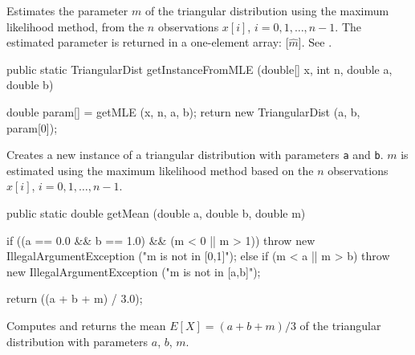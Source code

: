 \begin{tabb}
   Estimates the parameter $m$ of the triangular distribution using the
   maximum likelihood method, from the $n$ observations $x[i]$,
   $i = 0, 1,\ldots, n-1$. The estimated parameter is returned in a one-element
   array: [$\hat m$].  See \cite{tOLI72a,tHUA07a,tKOT04a}.
\end{tabb}
\begin{htmlonly}
\end{htmlonly}
\begin{code}

   public static TriangularDist getInstanceFromMLE (double[] x, int n,
                                                    double a, double b)\begin{hide} {
      double param[] = getMLE (x, n, a, b);
      return new TriangularDist (a, b, param[0]);
   }\end{hide}
\end{code}
\begin{tabb}
  Creates a new instance of a triangular distribution with parameters
  \texttt{a} and \texttt{b}.  $m$ is estimated using the maximum
  likelihood method based on the $n$ observations
  $x[i]$, $i = 0, 1, \ldots, n-1$.
\end{tabb}
\begin{htmlonly}
\end{htmlonly}
\begin{code}

   public static double getMean (double a, double b, double m)\begin{hide} {
      if ((a == 0.0 && b == 1.0) && (m < 0 || m > 1))
         throw new IllegalArgumentException ("m is not in [0,1]");
      else if (m < a || m > b) 
         throw new IllegalArgumentException ("m is not in [a,b]");

      return ((a + b + m) / 3.0);
   }\end{hide}
\end{code}
\begin{tabb}  Computes and returns the mean $E[X] = (a + b + m)/3$
   of the triangular distribution with parameters $a$, $b$, $m$.
\end{tabb}
